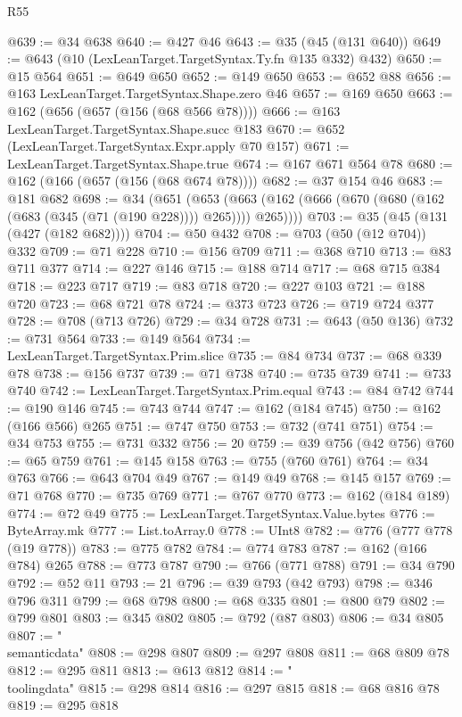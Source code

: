 \begin{lexlean}{R55}
\begin{coremodule}
{{{{{{{{{{{{{{{{{{{{{{{{{{{{{{{{{{{{{{{{{{{{{{{{{{{{{{{{{{{{{{@639 := @34 @638
@640 := @427 @46
@643 := @35 (@45 (@131 @640))
@649 := @643 (@10 (LexLeanTarget.TargetSyntax.Ty.fn @135 @332) @432)
@650 := @15 @564
@651 := @649 @650
@652 := @149 @650
@653 := @652 @88
@656 := @163 LexLeanTarget.TargetSyntax.Shape.zero @46
@657 := @169 @650
@663 := @162 (@656 (@657 (@156 (@68 @566 @78))))
@666 := @163 LexLeanTarget.TargetSyntax.Shape.succ @183
@670 := @652 (LexLeanTarget.TargetSyntax.Expr.apply @70 @157)
@671 := LexLeanTarget.TargetSyntax.Shape.true
@674 := @167 @671 @564 @78
@680 := @162 (@166 (@657 (@156 (@68 @674 @78))))
@682 := @37 @154 @46
@683 := @181 @682
@698 := @34
    (@651
      (@653 (@663 (@162 (@666 (@670 (@680 (@162 (@683 (@345 (@71 (@190 @228)))) @265)))) @265))))
@703 := @35 (@45 (@131 (@427 (@182 @682))))
@704 := @50 @432
@708 := @703 (@50 (@12 @704)) @332
@709 := @71 @228
@710 := @156 @709
@711 := @368 @710
@713 := @83 @711 @377
@714 := @227 @146
@715 := @188 @714
@717 := @68 @715 @384
@718 := @223 @717
@719 := @83 @718
@720 := @227 @103
@721 := @188 @720
@723 := @68 @721 @78
@724 := @373 @723
@726 := @719 @724 @377
@728 := @708 (@713 @726)
@729 := @34 @728
@731 := @643 (@50 @136)
@732 := @731 @564
@733 := @149 @564
@734 := LexLeanTarget.TargetSyntax.Prim.slice
@735 := @84 @734
@737 := @68 @339 @78
@738 := @156 @737
@739 := @71 @738
@740 := @735 @739
@741 := @733 @740
@742 := LexLeanTarget.TargetSyntax.Prim.equal
@743 := @84 @742
@744 := @190 @146
@745 := @743 @744
@747 := @162 (@184 @745)
@750 := @162 (@166 @566) @265
@751 := @747 @750
@753 := @732 (@741 @751)
@754 := @34 @753
@755 := @731 @332
@756 := 20
@759 := @39 @756 (@42 @756)
@760 := @65 @759
@761 := @145 @158
@763 := @755 (@760 @761)
@764 := @34 @763
@766 := @643 @704 @49
@767 := @149 @49
@768 := @145 @157
@769 := @71 @768
@770 := @735 @769
@771 := @767 @770
@773 := @162 (@184 @189)
@774 := @72 @49
@775 := LexLeanTarget.TargetSyntax.Value.bytes
@776 := ByteArray.mk
@777 := List.toArray.{0}
@778 := UInt8
@782 := @776 (@777 @778 (@19 @778))
@783 := @775 @782
@784 := @774 @783
@787 := @162 (@166 @784) @265
@788 := @773 @787
@790 := @766 (@771 @788)
@791 := @34 @790
@792 := @52 @11
@793 := 21
@796 := @39 @793 (@42 @793)
@798 := @346 @796 @311
@799 := @68 @798
@800 := @68 @335
@801 := @800 @79
@802 := @799 @801
@803 := @345 @802
@805 := @792 (@87 @803)
@806 := @34 @805
@807 := "\\semanticdata"
@808 := @298 @807
@809 := @297 @808
@811 := @68 @809 @78
@812 := @295 @811
@813 := @613 @812
@814 := "\\toolingdata"
@815 := @298 @814
@816 := @297 @815
@818 := @68 @816 @78
@819 := @295 @818
}}}}}}}}}}}}}}}}}}}}}}}}}}}}}}}}}}}}}}}}}}}}}}}}}}}}}}}}}}}}}}
\end{coremodule}
\end{lexlean}
